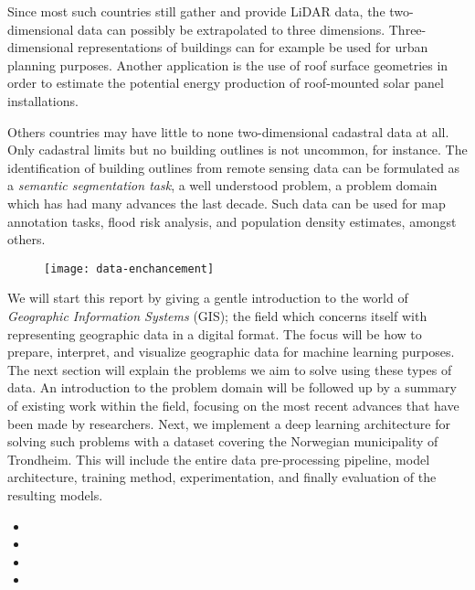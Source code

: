 Since most such countries still gather and provide LiDAR data, the two-dimensional data can possibly be extrapolated to three dimensions.
Three-dimensional representations of buildings can for example be used for urban planning purposes.
Another application is the use of roof surface geometries in order to estimate the potential energy production of roof-mounted solar panel installations.

Others countries may have little to none two-dimensional cadastral data at all.
Only cadastral limits but no building outlines is not uncommon, for instance.
The identification of building outlines from remote sensing data can be formulated as a \textit{semantic segmentation task}, a well understood problem, a problem domain which has had many advances the last decade.
Such data can be used for map annotation tasks, flood risk analysis, and population density estimates, amongst others.

\begin{figure}[htb]
  \texttt{[image: data-enchancement]}
\end{figure}

We will start this report by giving a gentle introduction to the world of \textit{Geographic Information Systems} (GIS); the field which concerns itself with representing geographic data in a digital format.
The focus will be how to prepare, interpret, and visualize geographic data for machine learning purposes.
The next section will explain the problems we aim to solve using these types of data.
An introduction to the problem domain will be followed up by a summary of existing work within the field, focusing on the most recent advances that have been made by researchers.
Next, we implement a deep learning architecture for solving such problems with a dataset covering the Norwegian municipality of Trondheim.
This will include the entire data pre-processing pipeline, model architecture, training method, experimentation, and finally evaluation of the resulting models.

\begin{itemize}
  \item {}
  \item {}
  \item {}
  \item {}
\end{itemize}
